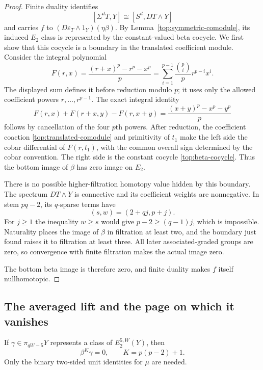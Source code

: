 \begin{proof}
Finite duality identifies
\[
 [\Sigma^dT,Y]\cong[S^d,DT\wedge Y]
\]
and carries $f$ to
$(D\varepsilon_T\wedge1_Y)(\eta\beta)$.
By Lemma~\ref{top:symmetric-comodule}, its induced $E_2$ class is
represented by the constant-valued beta cocycle. We first show that this cocycle
is a boundary in the translated coefficient module.
Consider the integral polynomial
\begin{equation}
\label{top:carry-polynomial}
 F(r,x)=\frac{(r+x)^p-r^p-x^p}{p}
       =\sum_{i=1}^{p-1}\frac{\binom pi}{p}r^{p-i}x^i.
\end{equation}
The displayed sum defines it before reduction modulo $p$; it uses
only the allowed coefficient powers $r,\ldots,r^{p-1}$.
The exact integral identity
\begin{equation}
\label{top:carry-boundary}
 F(r,x)+F(r+x,y)-F(r,x+y)
       =\frac{(x+y)^p-x^p-y^p}{p}
\end{equation}
follows by cancellation of the four $p$th powers.
After reduction, the coefficient coaction
\eqref{top:translated-comodule} and primitivity of $t_1$ make the
left side the cobar differential of $F(r,t_1)$, with the common
overall sign determined by the cobar convention. The right side
is the constant cocycle \eqref{top:beta-cocycle}. Thus the bottom
image of $\beta$ has zero image on $E_2$.

There is no possible higher-filtration homotopy value hidden by
this boundary. The spectrum $DT\wedge Y$ is connective and its
coefficient weights are nonnegative. In stem $pq-2$, its
$q$-sparse terms have
\[
 (s,w)=(2+qj,p+j).
\]
For $j\geq1$ the inequality $w\geq s$ would give
$p-2\geq(q-1)j$, which is impossible. Naturality places the
image of $\beta$ in filtration at least two, and the boundary
just found raises it to filtration at least three. All later
associated-graded groups are zero, so convergence with finite
filtration makes the actual image zero.

The bottom beta image is therefore zero, and finite duality makes
$f$ itself nullhomotopic.
\end{proof}

\subsection{The averaged lift and the page on which it vanishes}

\begin{proposition}
\label{top:annihilation}
If $\gamma\in\pi_{qW-5}Y$ represents a class of
$E_2^{5,W}(Y)$, then
\begin{equation}
\label{top:beta-annihilation}
 \beta^K\gamma=0,\qquad K=p(p-2)+1.
\end{equation}
Only the binary two-sided unit identities for $\mu$ are needed.
\end{proposition}

